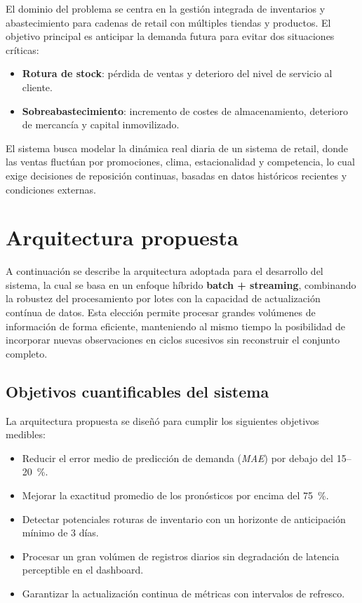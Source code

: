 \documentclass[12pt,a4paper]{article}
\begin{document}
	El dominio del problema se centra en la gestión integrada de inventarios y abastecimiento para cadenas de retail con múltiples tiendas y productos. El objetivo principal es anticipar la demanda futura para evitar dos situaciones críticas:
	
	\begin{itemize}
		\item \textbf{Rotura de stock}: pérdida de ventas y deterioro del nivel de servicio al cliente.
		\item \textbf{Sobreabastecimiento}: incremento de costes de almacenamiento, deterioro de mercancía y capital inmovilizado.
	\end{itemize}
	
	El sistema busca modelar la dinámica real diaria de un sistema de retail, donde las ventas fluctúan por promociones, clima, estacionalidad y competencia, lo cual exige decisiones de reposición continuas, basadas en datos históricos recientes y condiciones externas.
	
	
	\section{Arquitectura propuesta}
	A continuación se describe la arquitectura adoptada para el desarrollo del sistema, la cual se basa en un enfoque híbrido \textbf{batch + streaming}, combinando la robustez del procesamiento por lotes con la capacidad de actualización contínua de datos. Esta elección permite procesar grandes volúmenes de información de forma eficiente, manteniendo al mismo tiempo la posibilidad de incorporar nuevas observaciones en ciclos sucesivos sin reconstruir el conjunto completo.
	
	\subsection{Objetivos cuantificables del sistema}
	
	La arquitectura propuesta se diseñó para cumplir los siguientes objetivos medibles:
	
	\begin{itemize}
		\item Reducir el error medio de predicción de demanda (\textit{MAE}) por debajo del 15--20~\%.
		\item Mejorar la exactitud promedio de los pronósticos por encima del 75~\%.
		\item Detectar potenciales roturas de inventario con un horizonte de anticipación mínimo de 3 días.
		\item Procesar un gran volúmen de registros diarios sin degradación de latencia perceptible en el dashboard.
		\item Garantizar la actualización continua de métricas con intervalos de refresco.
	\end{itemize}
	
\end{document}
